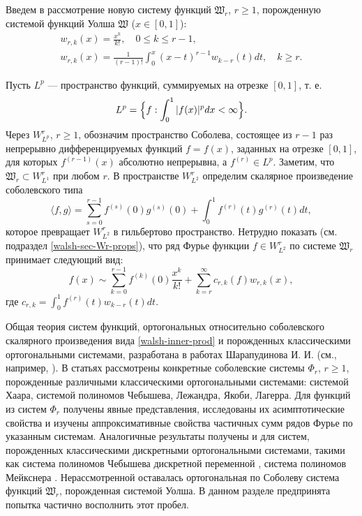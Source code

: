 Введем в рассмотрение новую систему функций $\mathfrak{W}_r$, $r \ge 1$, порожденную системой функций Уолша $\mathfrak{W}$ ($x \in [0,1]$):
\begin{gather}
\label{walsh-wrk-1}
w_{r,k}(x) = \frac{x^k}{k!}, \quad 0 \le k \le r-1,\\
\label{walsh-wrk-2}
w_{r,k}(x) = \frac{1}{(r-1)!}\int_{0}^{x}(x-t)^{r-1}w_{k-r}(t)dt, \quad k \ge r.
\end{gather}



Пусть $L^p$ --- пространство функций, суммируемых на отрезке $[0,1]$, т. е.
\begin{equation}
L^p=\Bigl\{
f: \int_{0}^{1}|f(x)|^pdx < \infty
\Bigr\}.
\end{equation}
Через $W_{L^p}^r$, $r \ge 1$, обозначим пространство Соболева, состоящее из $r-1$ раз непрерывно дифференцируемых функций $f=f(x)$, заданных на отрезке $[0,1]$, для которых $f^{(r-1)}(x)$ абсолютно непрерывна, а $f^{(r)}\in L^p$. Заметим, что $\mathfrak{W}_r \subset W_{L^1}^r$ при любом $r$. В пространстве $W_{L^2}^r$ определим скалярное произведение соболевского типа
\begin{equation}\label{walsh-inner-prod}
\langle f,g \rangle=\sum_{s=0}^{r-1}f^{(s)}(0)g^{(s)}(0)+\int_0^1 f^{(r)}(t)g^{(r)}(t)dt,
\end{equation}
которое превращает $W_{L^2}^r$ в гильбертово пространство.
Нетрудно показать (см. подраздел \ref{walsh-sec-Wr-props}), что ряд Фурье функции $f \in W_{L^2}^r$ по системе $\mathfrak{W}_r$ принимает следующий вид:
\begin{equation}\label{walsh-fourier-series-intro}
f(x) \sim \sum_{k=0}^{r-1}f^{(k)}(0)\frac{x^k}{k!}+
\sum_{k=r}^{\infty}c_{r,k}(f)w_{r,k}(x),
\end{equation}
где $c_{r,k}=\int_{0}^{1}f^{(r)}(t)w_{k-r}(t)dt$.

Общая теория систем функций, ортогональных относительно соболевского скалярного произведения вида \eqref{walsh-inner-prod} и порожденных классическими ортогональными системами, разработана в работах Шарапудинова И. И. (см., например, \cite{SharIzv2018}). В статьях \cite{SharIzv2018, Shar2017, SharSMJ2017, walsh-ShII-2015-demi} рассмотрены конкретные соболевские системы $\Phi_r$, $r \ge 1$, порожденные различными классическими ортогональными системами: системой Хаара, системой полиномов Чебышева, Лежандра, Якоби, Лагерра. Для функций из систем $\Phi_r$ получены явные представления, исследованы их асимптотические свойства и изучены аппроксимативные свойства частичных сумм рядов Фурье по указанным системам. 
Аналогичные результаты получены и для систем, порожденных классическими дискретными ортогональными системами, такими как система полиномов Чебышева дискретной переменной \cite{SharIZVUZ}, система полиномов Мейкснера \cite{walsh-ShII-meix-2016, walsh-Gadzh-2016-saratov}. Нерассмотренной оставалась ортогональная по Соболеву система функций $\mathfrak{W}_r$, порожденная системой Уолша. В данном разделе предпринята попытка частично восполнить этот пробел.

